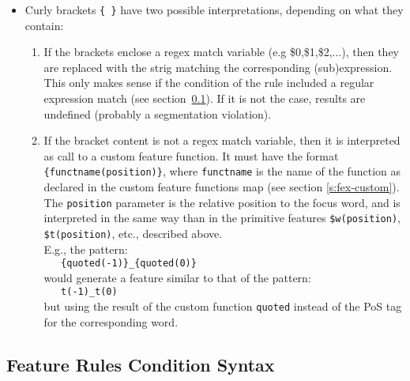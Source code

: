 \documentclass[a4paper]{book}
\begin{document}
\begin{itemize}
      In the sentence \textit{John lives here.}, the features for
      word \textit{here} in a window of [-2,0] with the above
      pattern would be: \verb#pbig@-2:john_VBZ#,
      \verb#pbig@-2:john_NNS#, \verb#pbig@-1:lives_RB#, and
      \verb#pbig@0:here_Fp#. Note that there are two features
      generated for window position $-2$ because the word 
      \textit{lives} has two possible PoS tags.
      
    \item Curly brackets {\tt \{ \}} have two possible
      interpretations, depending on what they contain:
      \begin{enumerate}
       \item If the brackets enclose a regex match variable (e.g
         \$0,\$1,\$2,...), then they are replaced with the strig
         matching the corresponding (sub)expression.  This only makes
         sense if the condition of the rule included a regular
         expression match (see section~\ref{s:fex-cond}). If it is not
         the case, results are undefined (probably a segmentation
         violation).
       \item If the bracket content is not a regex match variable,
         then it is interpreted as call to a custom feature
         function. It must have the format \verb#{functname(position)}#,
         where \verb#functname# is the name of the function as
         declared in the custom feature functions map (see section
         \ref{s:fex-custom}). The \verb#position# parameter is the relative
         position to the focus word, and is interpreted in the same 
         way than in the primitive features \verb#$w(position)#, 
         \verb#$t(position)#, etc., described above.\\
         E.g., the pattern:\\
         \verb#   {quoted(-1)}_{quoted(0)}#\\
         would generate a feature similar to that of the pattern:\\
         \verb#   t(-1)_t(0)#\\
         but using the result of the custom function \verb#quoted#
         instead of the PoS tag for the corresponding word.
      \end{enumerate}

  \end{itemize}

\subsection{Feature Rules Condition Syntax}
\label{s:fex-cond}
\end{document}
